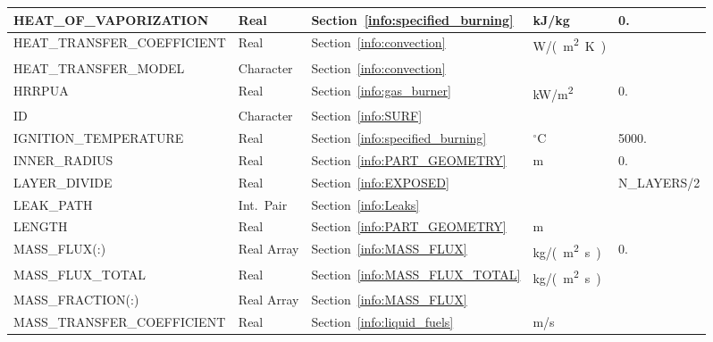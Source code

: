 \documentclass[11pt]{book}
\begin{document}
\begin{longtable}{@{\extracolsep{\fill}}|l|l|l|l|l|}
{\ct HEAT\_OF\_VAPORIZATION}          & Real            & Section~\ref{info:specified_burning}      & kJ/kg               & 0.                      \\ \hline
{\ct HEAT\_TRANSFER\_COEFFICIENT}     & Real            & Section~\ref{info:convection}             & \si{W/(m^2.K)}      &                         \\ \hline
{\ct HEAT\_TRANSFER\_MODEL}           & Character       & Section~\ref{info:convection}             &                     &                         \\ \hline
{\ct HRRPUA}                          & Real            & Section~\ref{info:gas_burner}             & \si{kW/m^2}         & 0.                      \\ \hline
{\ct ID}                              & Character       & Section~\ref{info:SURF}                   &                     &                         \\ \hline
{\ct IGNITION\_TEMPERATURE}           & Real            & Section~\ref{info:specified_burning}      & $^\circ$C           & 5000.                   \\ \hline
{\ct INNER\_RADIUS}                   & Real            & Section~\ref{info:PART_GEOMETRY}          & m                   & 0.                      \\ \hline
{\ct LAYER\_DIVIDE}                   & Real            & Section~\ref{info:EXPOSED}                &                     & {\ct N\_LAYERS}/2       \\ \hline
{\ct LEAK\_PATH}                      & Int.~Pair       & Section~\ref{info:Leaks}                  &                     &                         \\ \hline
{\ct LENGTH}                          & Real            & Section~\ref{info:PART_GEOMETRY}          & m                   &                         \\ \hline
{\ct MASS\_FLUX(:)}                   & Real Array      & Section~\ref{info:MASS_FLUX}              & \si{kg/(m^2.s)}     & 0.                      \\ \hline
{\ct MASS\_FLUX\_TOTAL}               & Real            & Section~\ref{info:MASS_FLUX_TOTAL}        & \si{kg/(m^2.s)}     &                         \\ \hline
{\ct MASS\_FRACTION(:)}               & Real Array      & Section~\ref{info:MASS_FLUX}              &                     &                         \\ \hline
{\ct MASS\_TRANSFER\_COEFFICIENT}     & Real            & Section~\ref{info:liquid_fuels}           & m/s                 &                         \\ \hline

\end{longtable}
\end{document}

